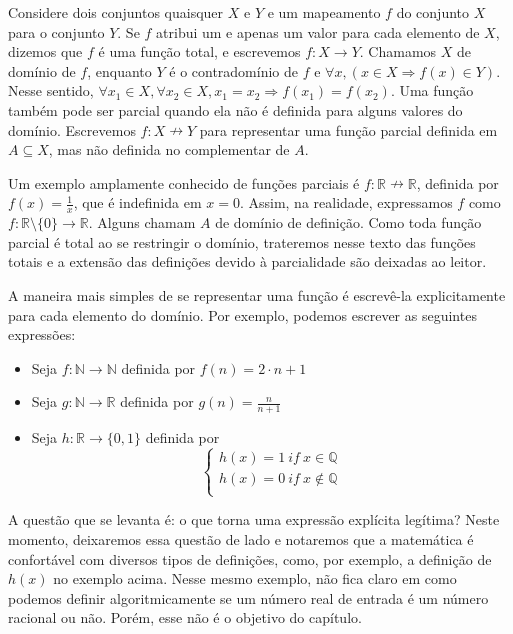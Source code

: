 Considere dois conjuntos quaisquer $X$ e $Y$ e um mapeamento $f$
do conjunto $X$ para o conjunto $Y$. Se $f$ atribui um e apenas
um valor para cada elemento de $X$, dizemos que $f$ é uma função total, e
escrevemos $f: X \to Y$.  Chamamos $X$ de domínio de $f$, enquanto
$Y$ é o contradomínio de $f$ e $\forall x, (x \in X  \Rightarrow f(x) \in Y)$.
Nesse sentido, $\forall x_1 \in X, \forall x_2 \in X, x_1 = x_2 \Rightarrow f(x_1) = f(x_2)$.
Uma função também pode ser parcial quando ela não é definida para alguns valores
do domínio. Escrevemos $f: X \nrightarrow Y $ para representar uma função parcial definida em 
$A \subseteq X $, mas não definida no complementar de $A$. 

Um exemplo amplamente conhecido de funções parciais é $f: \mathbb{R} \nrightarrow \mathbb{R}$, 
definida por $f(x) = \frac{1}{x}$, que é indefinida em $x = 0$. Assim, na realidade, expressamos $f$ como
$f : \mathbb{R} \setminus \{0\} \to \mathbb{R}$. Alguns chamam $A$ de domínio de definição. 
Como toda função parcial é total ao se restringir o domínio, trateremos nesse texto das funções totais 
e a extensão das definições devido à parcialidade são deixadas ao leitor.  

A maneira mais simples de se representar uma função é escrevê-la explicitamente
para cada elemento do domínio. Por exemplo, podemos escrever as seguintes expressões:

\begin{itemize}
    \item Seja $f: \mathbb{N} \to \mathbb{N}$ definida por
    $f(n) = 2\cdot n + 1$
    \item Seja $g : \mathbb{N} \to \mathbb{R}$ definida por
    $g(n) = \frac{n}{n+1}$
    \item Seja $h : \mathbb{R} \to \{0,1\}$ definida por
    $$\left \{ \begin{array}{c}
    h(x) = 1 ~if~x \in \mathbb{Q} \\
    h(x) = 0 ~ if ~ x \not \in \mathbb{Q} \\
    \end{array}
    \right. $$
 \end{itemize}

A questão que se levanta é: o que torna uma expressão explícita legítima?
Neste momento, deixaremos essa questão de lado e notaremos que a matemática
é confortável com diversos tipos de definições, como, por exemplo, a definição
de $h(x)$ no exemplo acima. Nesse mesmo exemplo, não fica claro em como podemos
definir algoritmicamente se um número real de entrada é um número racional ou não.
Porém, esse não é o objetivo do capítulo.

